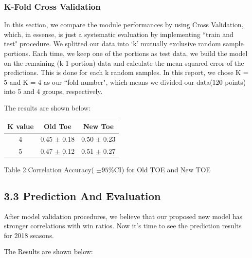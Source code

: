\documentclass[11pt]{article}
\begin{document}
\subsubsection*{K-Fold Cross Validation}
In this section, we compare the module performances by using 
Cross Validation, which, in essense, is just a systematic evaluation by implementing ``train and test" procedure.
We splitted our data into `k' mutually exclusive random sample portions. Each time, we keep one of the portions as test data, we build the model on the remaining (k-1 portion) data and calculate the mean squared error of the predictions. This is done for each k random samples.
In this report, we chose K = 5 and K = 4 as our ``fold number", which means we divided our data(120 points) into 5 and 4 groups, respectively.

The results are shown below:

\begin{center}
\begin{tabular}{|c|c|c|}
\hline
 K value & Old Toe & New Toe \\
\hline
 4 & 0.45 $\pm$ 0.18 & 0.50 $\pm$ 0.23\\
 5 & 0.47 $\pm$ 0.12 & 0.51 $\pm$ 0.27 \\
\hline
\end{tabular}
\bigskip

Table 2:Correlation Accuracy( $\pm 95\%$CI) for Old TOE and New TOE
\end{center}

\subsection*{3.3 Prediction And Evaluation}
After model validation procedures, we believe that our proposed new model has stronger correlations with win ratios.
Now it's time to see the prediction results for 2018 seasons.

The Results are shown below:
\end{document}
